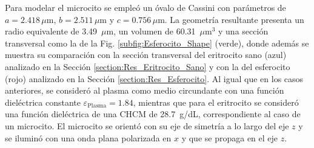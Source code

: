 Para modelar el microcito se empleó un óvalo de Cassini con parámetros de $a=2.418\,\mu\text{m}$, $b=2.511\,\mu\text{m}$ y $c=0.756\,\mu\text{m}$. La geometría resultante presenta un radio equivalente de 3.49~$\mu$m, un volumen de 60.31~$\mu\text{m}^3$ y una sección transversal como la de la Fig. \ref{subfig:Esferocito_Shape} (verde), donde además se muestra su comparación con la sección transversal del eritrocito sano (azul) analizado en la Sección \ref{section:Res_Eritrocito_Sano} y con la del esferocito (rojo) analizado en la Sección \ref{section:Res_Esferocito}. Al igual que en los casos anteriores, se consideró al plasma como medio circundante con una función dieléctrica constante $\varepsilon_{\text{Plasma}}=1.84$, mientras que para el eritrocito se consideró una función dieléctrica de una CHCM de 28.7~g/dL, correspondiente al caso de un microcito. El microcito se orientó con su eje de simetría a lo largo del eje $z$ y se iluminó con una onda plana polarizada en $x$ y que se propaga en el eje $z$.

